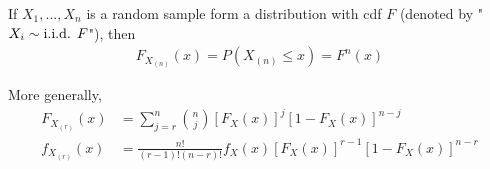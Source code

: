 \documentclass[11pt]{elegantbook}
\begin{document}
\begin{proposition}[Distribution of $X_{n}=\max_{i=1,...,n}X_i$]
    If $X_1,...,X_n$ is a random sample form a distribution with cdf $F$ (denoted by "$X_i\sim \textnormal{i.i.d. } F$"), then
    \begin{equation}
        \begin{aligned}
            F_{X_{(n)}}(x)=P(X_{(n)}\leq x)=F^n(x)
        \end{aligned}
        \nonumber
    \end{equation}
\end{proposition}
\begin{proposition}
    More generally,
    \begin{equation}
        \begin{aligned}
            F_{X_{(r)}}(x)&=\sum _{j=r}^{n}{\binom {n}{j}}[F_{X}(x)]^{j}[1-F_{X}(x)]^{n-j}\\
            f_{X_{(r)}}(x)&={\frac {n!}{(r-1)!(n-r)!}}f_{X}(x)[F_{X}(x)]^{r-1}[1-F_{X}(x)]^{n-r}
        \end{aligned}
        \nonumber
    \end{equation}
\end{proposition}
\end{document}
